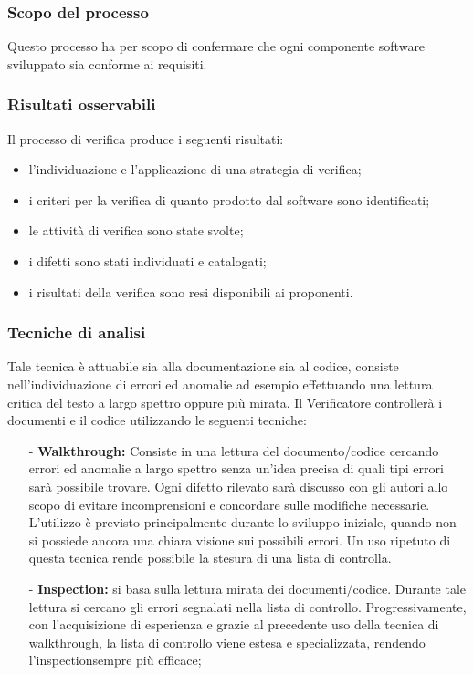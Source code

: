 \documentclass[a4paper,11pt]{article}
\begin{document}
				\subsubsection{Scopo del processo}
					Questo processo ha per scopo di confermare che ogni componente software sviluppato sia conforme ai requisiti.		
				\subsubsection{Risultati osservabili}
				Il processo di verifica produce i seguenti risultati:
				\begin{itemize}
					\item l'individuazione e l'applicazione di una strategia di verifica;
					\item i criteri per la verifica di quanto prodotto dal software sono identificati;
					\item le attività di verifica sono state svolte;
					\item i difetti sono stati individuati e catalogati;
					\item i risultati della verifica sono resi disponibili ai proponenti.
				\end{itemize}
				
				\subsubsection{Tecniche di analisi}
				Tale tecnica è attuabile sia alla documentazione sia al codice, consiste nell'individuazione di errori ed anomalie ad esempio effettuando una lettura critica del testo a largo spettro oppure più mirata. Il Verificatore controllerà i documenti e il codice utilizzando le seguenti tecniche:
				\begin{itemize}
				\item[-]\textbf{Walkthrough\addglos:} Consiste in una lettura del documento/codice cercando errori ed anomalie a largo spettro senza un'idea precisa di quali tipi errori sarà possibile trovare. Ogni difetto rilevato sarà discusso con gli autori allo scopo di evitare incomprensioni e concordare sulle modifiche necessarie. L'utilizzo è previsto principalmente durante lo sviluppo iniziale, quando non si possiede ancora una chiara visione sui possibili errori. Un uso ripetuto di questa tecnica rende possibile la stesura di una lista di controlla. 		
				
				\item[-]\textbf{Inspection\addglos:} si basa sulla lettura mirata dei documenti/codice. Durante tale lettura si cercano gli errori segnalati nella lista di controllo. Progressivamente, con l'acquisizione di esperienza e grazie al precedente uso della tecnica di walkthrough\addglos, la lista di controllo viene estesa e specializzata, rendendo l'inspection\addglos sempre più efficace;
				\end{itemize}
				
\end{document}

